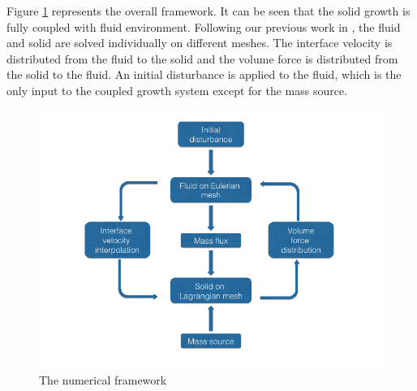 Figure \ref{fig:framework} represents the overall framework. It can be seen that the solid growth is fully coupled with fluid environment. Following our previous work in \cite{Zhang, Zhang3, Zhang16, Zhang17}, the fluid and solid are solved individually on different meshes. The interface velocity is distributed from the fluid to the solid and the volume force is distributed from the solid to the fluid. An initial disturbance is applied to the fluid, which is the only input to the coupled growth system except for the mass source.
\begin{figure}[H]
   \centering
   \includegraphics[width=.5\textwidth]{./figs/framework.png} %
   \caption{The numerical framework}
   \label{fig:framework}
\end{figure}





